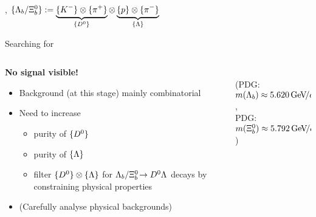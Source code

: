 \begin{frame}
    \centering

    \ie{}, $\{ {{\Lambda}_{b}}/{{\Xi}^0_{b}} \} := \underbrace{\{ {{K}^-} \} \otimes \{ {{\pi}^+} \}}_{\{ {{D}^0} \}} \otimes \underbrace{\{ {p} \} \otimes \{ {{\pi}^-} \}}_{\{ {\Lambda} \}}$
\end{frame}

\begin{frame}{Searching for \decay{\Lb/\Xibz}{\Dz\Lz}}
    \begin{columns}
        \begin{column}{.55\textwidth}
            \textbf{No signal visible!}
            \begin{itemize}
                \item Background (at this stage) mainly combinatorial
                \item Need to increase
                \begin{itemize}
                    \item purity of $\{ {{D}^0} \}$
                    \item purity of $\{ {\Lambda} \}$
                    \item filter $\{ {{D}^0} \} \otimes \{ {\Lambda} \}$ for ${{\Lambda}_{b}}/{{\Xi}^0_{b}}\!\rightarrow {\ensuremath{{D}^0}}{\ensuremath{\Lambda}}$ decays by constraining physical properties
                \end{itemize}
                \item (Carefully analyse physical backgrounds\ftntdagger)
            \end{itemize}
        \end{column}
        \begin{column}{.45\textwidth}
            \\
            \hspace{5mm} \footnotesize (PDG: $m({{\Lambda}_{b}}) \approx 5.620{\mathrm{\,Ge\kern -0.1em V\!/}c^2}$,\\
            \hspace{5mm} \footnotesize \phantom{(}PDG: $m({{\Xi}^0_{b}}) \approx 5.792{\mathrm{\,Ge\kern -0.1em V\!/}c^2}$)
        \end{column}
    \end{columns}
\end{frame}

